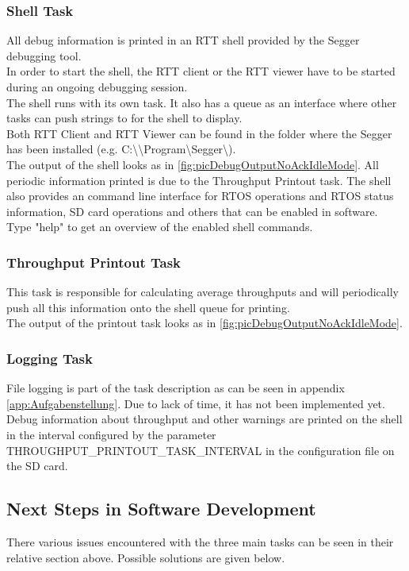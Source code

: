 \subsubsection{Shell Task}
%
All debug information is printed in an RTT shell provided by the Segger debugging tool.\\
In order to start the shell, the RTT client or the RTT viewer have to be started during an ongoing debugging session.\\
The shell runs with its own task. It also has a queue as an interface where other tasks can push strings to for the shell to display.\\
Both RTT Client and RTT Viewer can be found in the folder where the Segger has been installed (e.g. C:\textbackslash \textbackslash Program\textbackslash Segger\textbackslash).\\
The output of the shell looks as in \autoref{fig:picDebugOutputNoAckIdleMode}. All periodic information printed is due to the Throughput Printout task. The shell also provides an command line interface for RTOS operations and RTOS status information, SD card operations and others that can be enabled in software. Type "help" to get an overview of the enabled shell commands.
%
\subsubsection{Throughput Printout Task}
This task is responsible for calculating average throughputs and will periodically push all this information onto the shell queue for printing.\\
The output of the printout task looks as in \autoref{fig:picDebugOutputNoAckIdleMode}.
%
\subsubsection{Logging Task}
File logging is part of the task description as can be seen in appendix \autoref{app:Aufgabenstellung}. Due to lack of time, it has not been implemented yet.\\
Debug information about throughput and other warnings are printed on the shell in the interval configured by the parameter THROUGHPUT\_PRINTOUT\_TASK\_INTERVAL in the configuration file on the SD card.
%
%
\subsection{Next Steps in Software Development}%
%
There various issues encountered with the three main tasks can be seen in their relative section above. Possible solutions are given below.
%
